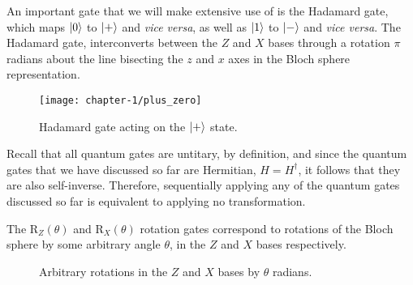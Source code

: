 An important gate that we will make extensive use of is the Hadamard gate, which maps $\ket 0$ to $\ket +$ and \textit{vice versa}, as well as $\ket 1$ to $\ket -$ and \textit{vice versa}. The Hadamard gate, interconverts between the $Z$ and $X$ bases through a rotation $\pi$ radians about the line bisecting the $z$ and $x$ axes in the Bloch sphere representation.

\begin{figure}[H]
    \centering
    \texttt{[image: chapter-1/plus\_zero]}
    \caption{Hadamard gate acting on the $\ket +$ state.}
\end{figure}

Recall that all quantum gates are untitary, by definition, and since the quantum gates that we have discussed so far are Hermitian, $H = H^\dagger$, it follows that they are also self-inverse. Therefore, sequentially applying any of the quantum gates discussed so far is equivalent to applying no transformation.

The R$_Z(\theta)$ and R$_X(\theta)$ rotation gates correspond to rotations of the Bloch sphere by some arbitrary angle $\theta$, in the $Z$ and $X$ bases respectively.

\begin{figure}[H]
    \centering
    \begin{minipage}{0.45\textwidth}
        \centering
    \end{minipage}
    \begin{minipage}{0.45\textwidth}
        \centering
    \end{minipage}
    \caption{Arbitrary rotations in the $Z$ and $X$ bases by $\theta$ radians.}
\end{figure}

